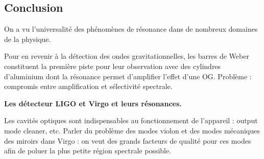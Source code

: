 \subsection*{Conclusion}

On a vu l'universalité des phénomènes de résonance dans de nombreux domaines de la physique.

Pour en revenir à la détection des ondes gravitationnelles, les barres de Weber constituent la première piste pour leur observation avec des cylindres d'aluminium dont la résonance permet d'amplifier l'effet d'une OG.
Problème : compromis entre amplification et sélectivité spectrale.
\begin{slide}
\textbf{Les détecteur LIGO et Virgo et leurs résonances.}
\end{slide}
Les cavités optiques sont indispensables au fonctionnement de l'appareil : output mode cleaner, etc.
Parler du problème des modes violon et des modes mécaniques des miroirs dans Virgo : on veut des grands facteurs de qualité pour ces modes afin de poluer la plus petite région spectrale possible.

\newpage